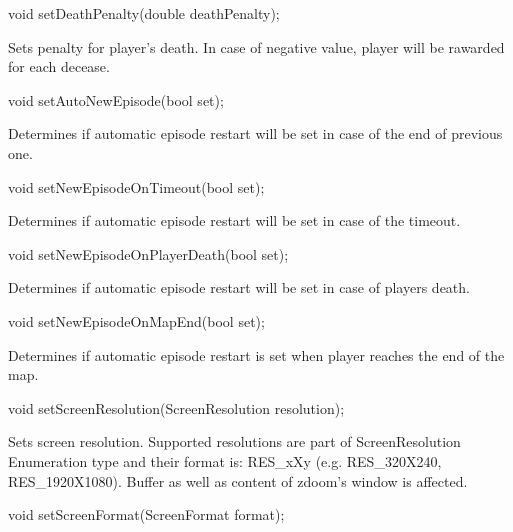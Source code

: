 \vspace{20pt}
\begin{clinee}
void setDeathPenalty(double deathPenalty);
\end{clinee}

Sets penalty for player's death. In case of negative value, player will be rawarded for each decease.


\vspace{20pt}
\begin{clinee}
void setAutoNewEpisode(bool set);
\end{clinee}

Determines if automatic episode restart will be set in case of the end of previous one.


\vspace{20pt}
\begin{clinee}
void setNewEpisodeOnTimeout(bool set);
\end{clinee}

Determines if automatic episode restart will be set in case of the timeout.


\vspace{20pt}
\begin{clinee}
void setNewEpisodeOnPlayerDeath(bool set);
\end{clinee}

Determines if automatic episode restart will be set in case of players death.


\vspace{20pt}
\begin{clinee}
void setNewEpisodeOnMapEnd(bool set);
\end{clinee}

Determines if automatic episode restart is set when player reaches the end of the map.


\vspace{20pt}
\begin{clinee}
void setScreenResolution(ScreenResolution resolution);
\end{clinee}

Sets screen resolution. Supported resolutions are part of ScreenResolution Enumeration type and their format is: RES\_xXy (e.g. RES\_320X240, RES\_1920X1080). Buffer as well as content of zdoom's window is affected.


\vspace{20pt}
\begin{clinee}
 void setScreenFormat(ScreenFormat format);
\end{clinee}


